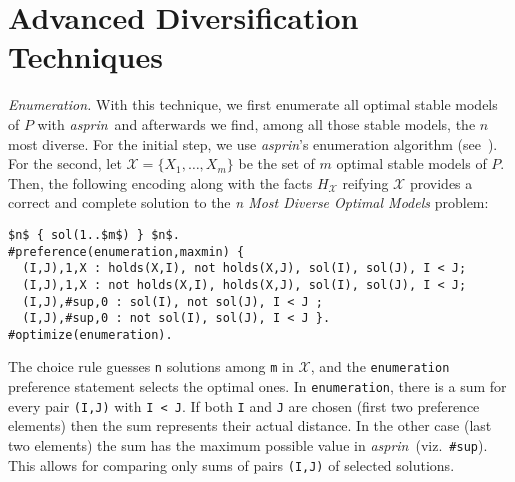 \documentclass[a4paper,USenglish]{oasics-v2016}
\newcommand{\sysfont}{\textit}
\newcommand{\asprin}{\sysfont{asprin}}
\begin{document}
\section{Advanced Diversification Techniques}\label{sec:advanced}

\emph{Enumeration.}
%
With this technique, we first enumerate all optimal stable models of $P$ with \asprin\
and afterwards we find, among all those stable models, the $n$ most diverse.
%
For the initial step, we use \asprin{}'s enumeration algorithm (see~\cite{brderosc15a}).
For the second, let $\mathcal{X}=\{ X_1, \ldots, X_m \}$ be the set of $m$ optimal stable models of $P$.
Then, the following encoding along with the facts $H_\mathcal{X}$ reifying $\mathcal{X}$ 
provides a correct and complete solution to the \emph{n Most Diverse Optimal Models} problem:
\begin{lstlisting}[mathescape=true,numbers=none]
$n$ { sol(1..$m$) } $n$.
#preference(enumeration,maxmin) { 
  (I,J),1,X : holds(X,I), not holds(X,J), sol(I), sol(J), I < J; 
  (I,J),1,X : not holds(X,I), holds(X,J), sol(I), sol(J), I < J;
  (I,J),#sup,0 : sol(I), not sol(J), I < J ;
  (I,J),#sup,0 : not sol(I), sol(J), I < J }.
#optimize(enumeration).  
\end{lstlisting}
The choice rule guesses \lstinline!n! solutions among \lstinline!m! in $\mathcal{X}$, 
and the \lstinline!enumeration! preference statement selects the optimal ones.
In \lstinline!enumeration!, there is a sum for every pair \lstinline!(I,J)! with \lstinline!I < J!.
If both \lstinline!I! and \lstinline!J! are chosen (first two preference elements) 
then the sum represents their actual distance.
In the other case (last two elements) the sum has the maximum possible value  in \asprin\
(viz.~\lstinline!#sup!).
This allows for comparing only sums of pairs \lstinline!(I,J)! of selected solutions.
\end{document}
